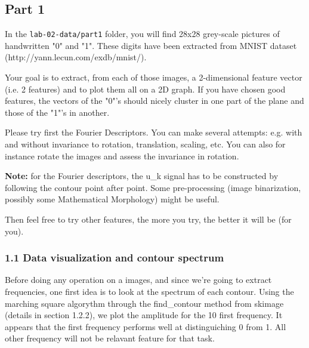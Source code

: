 \documentclass[11pt]{article}
\begin{document}
    \subsection{Part 1}\label{part-1}

In the \texttt{lab-02-data/part1} folder, you will find 28x28 grey-scale
pictures of handwritten "0" and "1". These digits have been extracted
from MNIST dataset (http://yann.lecun.com/exdb/mnist/).

Your goal is to extract, from each of those images, a 2-dimensional
feature vector (i.e. 2 features) and to plot them all on a 2D graph. If
you have chosen good features, the vectors of the "0"'s should nicely
cluster in one part of the plane and those of the "1"'s in another.

Please try first the Fourier Descriptors. You can make several attempts:
e.g. with and without invariance to rotation, translation, scaling, etc.
You can also for instance rotate the images and assess the invariance in
rotation.

\textbf{Note:} for the Fourier descriptors, the u\_k signal has to be
constructed by following the contour point after point. Some
pre-processing (image binarization, possibly some Mathematical
Morphology) might be useful.

Then feel free to try other features, the more you try, the better it
will be (for you).

    \subsubsection{1.1 Data visualization and contour
spectrum}\label{data-visualization-and-contour-spectrum}

Before doing any operation on a images, and since we're going to extract
frequencies, one first idea is to look at the spectrum of each contour.
Using the marching square algorythm through the find\_contour method
from skimage (details in section 1.2.2), we plot the amplitude for the
10 first frequency. It appears that the first frequency performs well at
distinguiching 0 from 1. All other frequency will not be relavant
feature for that task.
\end{document}
